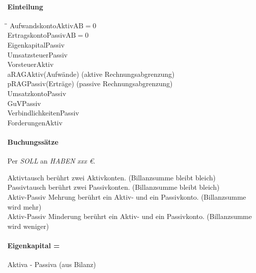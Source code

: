 \paragraph{Einteilung}
\begin{tabbing}
	\hspace{5cm}\=\hspace{2cm}\=\kill
	Aufwandskonto\>Aktiv\>$\text{AB}=0$\\
	Ertragskonto\>Passiv\>$\text{AB}=0$\\
	Eigenkapital\>Passiv\\
	Umsatzsteuer\>Passiv\\
	Vorsteuer\>Aktiv\\
	aRAG\>Aktiv\>(Aufwände) (aktive Rechnungsabgrenzung)\\
	pRAG\>Passiv\>(Erträge) (passive Rechnungsabgrenzung)\\
	Umsatzkonto\>Passiv\\
	GuV\>Passiv\\
	Verbindlichkeiten\>Passiv\\
	Forderungen\>Aktiv\\
\end{tabbing}

\paragraph{Buchungssätze} Per \emph{SOLL} an \emph{HABEN} \emph{xxx \euro}.

Aktivtausch berührt zwei Aktivkonten. (Billanzsumme bleibt bleich)\\
Passivtausch berührt zwei Passivkonten. (Billanzsumme bleibt bleich)\\
Aktiv-Passiv Mehrung berührt ein Aktiv- und ein Passivkonto. (Billanzsumme wird mehr)\\
Aktiv-Passiv Minderung berührt ein Aktiv- und ein Passivkonto. (Billanzsumme wird weniger)

\paragraph{Eigenkapital =} Aktiva - Passiva (aus Bilanz)